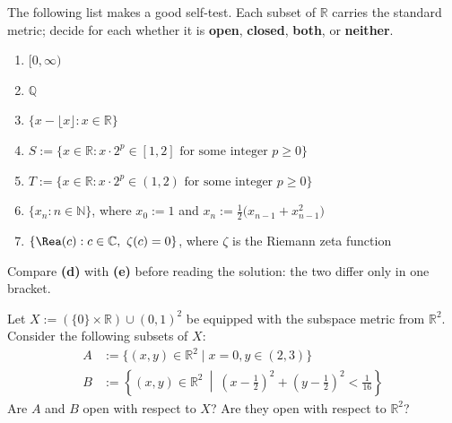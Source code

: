 \begin{exercise}
\label{ex:open_closed_self_test}
The following list makes a good self-test. Each subset of $\mathbb{R}$ carries the standard metric; decide for each whether it is \textbf{open},
\textbf{closed}, \textbf{both}, or \textbf{neither}.
\begin{enumerate}[label=\textbf{(\alph*)}]
  \item $[0,\infty)$
  \item $\mathbb{Q}$
  \item $\{x - \lfloor x \rfloor : x \in \mathbb{R}\}$
  \item $S := \{x \in \mathbb{R} : x\cdot 2^p \in [1,2] \text{ for some integer } p \geq 0\}$
  \item $T := \{x \in \mathbb{R} : x\cdot 2^p \in (1,2) \text{ for some integer } p \geq 0\}$
  \item $\{x_n : n \in \mathbb{N}\}$, where $x_0 := 1$ and
    $x_n := \tfrac12\big(x_{n-1} + x_{n-1}^2\big)$
  \item $\{\Rea(c) : c \in \mathbb{C},\ \zeta(c) = 0\}$, where $\zeta$ is the Riemann zeta
    function
\end{enumerate}
Compare \textbf{(d)} with \textbf{(e)} before reading the solution: the two differ only in one
bracket.
\end{exercise}

\begin{exercise}
\label{ex:relative_openness_subsets}
Let $X := (\{0\} \times \mathbb{R}) \cup (0,1)^2$ be equipped with the subspace metric from $\mathbb{R}^2$. Consider the following subsets of $X$:
\begin{align*}
  A &:= \{(x,y) \in \mathbb{R}^2 \mid x = 0, y \in (2,3)\} \\
  B &:= \left\{(x,y) \in \mathbb{R}^2 \ \middle|\ \left(x - \tfrac12\right)^2 + \left(y - \tfrac12\right)^2 < \tfrac{1}{16}\right\}
\end{align*}
Are $A$ and $B$ open with respect to $X$? Are they open with respect to $\mathbb{R}^2$?
\end{exercise}

